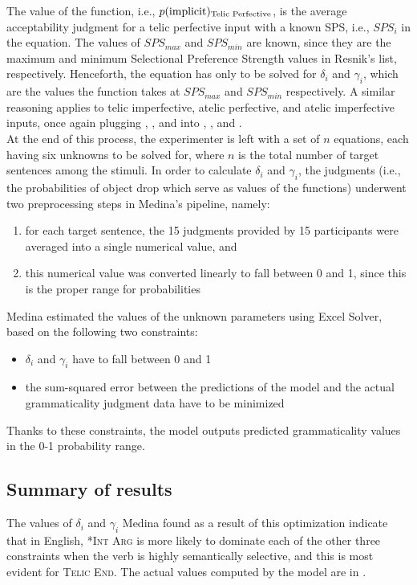 The value of the function, i.e., $p(\text{implicit})\textsubscript{Telic Perfective}$, is the average acceptability judgment for a telic perfective input with a known SPS, i.e., $SPS_{i}$ in the equation. The values of $SPS_{max}$ and $SPS_{min}$ are known, since they are the maximum and minimum Selectional Preference Strength values in Resnik's list, respectively. Henceforth, the equation has only to be solved for $\delta_i$ and $\gamma_i$, which are the values the function takes at $SPS_{max}$ and $SPS_{min}$ respectively. A similar reasoning applies to telic imperfective, atelic perfective, and atelic imperfective inputs, once again plugging , , and  into , , and .\\
At the end of this process, the experimenter is left with a set of $n$ equations, each having six unknowns to be solved for, where $n$ is the total number of target sentences among the stimuli. In order to calculate $\delta_i$ and $\gamma_i$, the judgments (i.e., the probabilities of object drop which serve as values of the functions) underwent two preprocessing steps in Medina's pipeline, namely:
\begin{enumerate}
    \item for each target sentence, the 15 judgments provided by 15 participants were averaged into a single numerical value, and
    \item this numerical value was converted linearly to fall between 0 and 1, since this is the proper range for probabilities
\end{enumerate}

Medina estimated the values of the unknown parameters using Excel Solver, based on the following two constraints: 
\begin{itemize}
    \item $\delta_i$ and $\gamma_i$ have to fall between 0 and 1
    \item the sum-squared error between the predictions of the model and the actual grammaticality judgment data have to be minimized
\end{itemize}
Thanks to these constraints, the model outputs predicted grammaticality values in the 0-1 probability range.

\subsection{Summary of results} 
The values of $\delta_i$ and $\gamma_i$ Medina found as a result of this optimization indicate that in English, \textsc{*Int Arg} is more likely to dominate each of the other three constraints when the verb is highly semantically selective, and this is most evident for \textsc{Telic End}. The actual values computed by the model are in .

